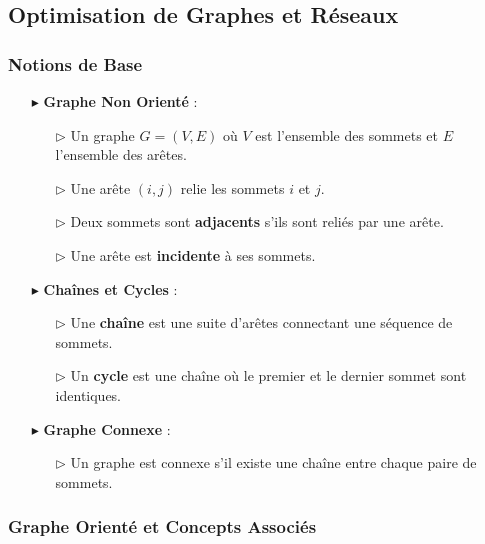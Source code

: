 \documentclass{report}
\begin{document}
\begin{multicols*}{2}
\chapter{Optimisation de Graphes et Réseaux}

\subsection*{Notions de Base}

\begin{itemize}
    \item[$\blacktriangleright$] \textbf{Graphe Non Orienté} :
    \begin{itemize}
        \item[$\rhd$] Un graphe \( G = (V, E) \) où \( V \) est l'ensemble des sommets et \( E \) l'ensemble des arêtes.
        \item[$\rhd$] Une arête \( (i, j) \) relie les sommets \( i \) et \( j \).
        \item[$\rhd$] Deux sommets sont \textbf{adjacents} s'ils sont reliés par une arête.
        \item[$\rhd$] Une arête est \textbf{incidente} à ses sommets.
    \end{itemize}
    \item[$\blacktriangleright$] \textbf{Chaînes et Cycles} :
    \begin{itemize}
        \item[$\rhd$] Une \textbf{chaîne} est une suite d'arêtes connectant une séquence de sommets.
        \item[$\rhd$] Un \textbf{cycle} est une chaîne où le premier et le dernier sommet sont identiques.
    \end{itemize}
    \item[$\blacktriangleright$] \textbf{Graphe Connexe} :
    \begin{itemize}
        \item[$\rhd$] Un graphe est connexe s'il existe une chaîne entre chaque paire de sommets.
    \end{itemize}
\end{itemize}

\subsection*{Graphe Orienté et Concepts Associés}


\end{multicols*}
\end{document}
